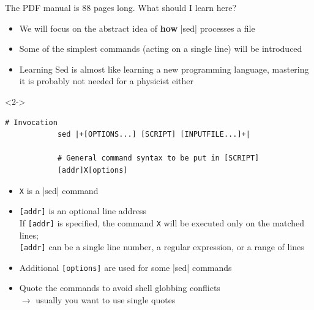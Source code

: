 \begin{frame}[fragile]{The PDF manual is 88 pages long. What should I learn here?}
    \vspace{-3mm}
    \begin{itemize}
        \item We will focus on the abstract idea of \textbf{how} \bash|sed| processes a file
        \item Some of the simplest commands (acting on a single line) will be introduced
        \item Learning Sed is almost like learning a new programming language, mastering it is probably not needed for a physicist either
    \end{itemize}
    \begin{uncoverenv}<2->
        \begin{lstlisting}[style=MyBash, numbers=none, aboveskip=2mm, belowskip=-5mm]
            # Invocation
            sed |+[OPTIONS...] [SCRIPT] [INPUTFILE...]+|

            # General command syntax to be put in [SCRIPT]
            [addr]X[options]
        \end{lstlisting}
    \end{uncoverenv}
    \begin{itemize}[<3>]
        \item \texttt{X} is a \bash|sed| command
        \item \texttt{[addr]} is an optional line address\\
              If \texttt{[addr]} is specified, the command \texttt{X} will be executed only on the matched lines;\\
              \texttt{[addr]} can be a single line number, a regular expression, or a range of lines
        \item Additional \texttt{[options]} are used for some \bash|sed| commands
        \item Quote the commands to avoid shell globbing conflicts\\
              $\to$ usually you want to use single quotes
    \end{itemize}
\end{frame}
